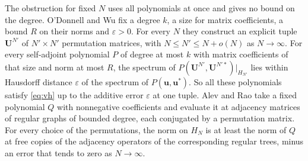 \documentclass[11pt]{article}
\theoremstyle{remark}
\begin{document}
The obstruction for fixed $N$ uses all polynomials at once and gives no bound on the degree.
O'Donnell and Wu \cite[Theorem~10.13]{OW} fix a degree $k$, a size for matrix coefficients, a bound $R$ on
their norms and $\varepsilon>0$. For every $N$ they construct an explicit tuple $\mathbf U^{N'}$ of $N'\times N'$ permutation
matrices, with $N\le N'\le N+o(N)$ as $N\to\infty$. For every self-adjoint polynomial $P$ of degree at most $k$ with
matrix coefficients of that size and norm at most $R$, the spectrum of $P(\mathbf U^{N'},\mathbf U^{N'*})|_{H_{N'}}$ lies within
Hausdorff distance $\varepsilon$ of the spectrum of $P(\mathbf u,\mathbf u^*)$. So all these polynomials satisfy \eqref{eq:vh} up to the additive error
$\varepsilon$ at one tuple. Alev and Rao \cite[Theorem~5.5]{AR} take a fixed polynomial $Q$ with nonnegative
coefficients and evaluate it at adjacency matrices of regular graphs of bounded degree, each conjugated by a
permutation matrix. For every choice of the permutations, the norm on $H_N$ is at least the norm of $Q$ at free
copies of the adjacency operators of the corresponding regular trees, minus an error that tends to zero as
$N\to\infty$.
\end{document}
